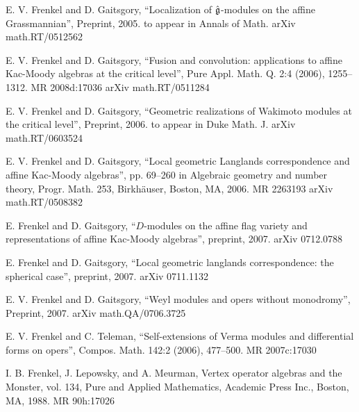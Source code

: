 \par{} E. V. Frenkel and D. Gaitsgory, ``Localization of $\hat{\mathfrak{g}}$-modules on the affine Grassmannian'', Preprint, 2005. to appear in Annals of Math. arXiv math.RT/0512562

\par{} E. V. Frenkel and D. Gaitsgory, ``Fusion and convolution: applications to affine Kac-Moody algebras at the critical level'', Pure Appl. Math. Q. 2:4 (2006), 1255--1312. MR 2008d:17036 arXiv math.RT/0511284

\par{} E. V. Frenkel and D. Gaitsgory, ``Geometric realizations of Wakimoto modules at the critical level'', Preprint, 2006. to appear in Duke Math. J. arXiv math.RT/0603524

\par{} E. V. Frenkel and D. Gaitsgory, ``Local geometric Langlands correspondence and affine Kac-Moody algebras'', pp. 69--260 in Algebraic geometry and number theory, Progr. Math. 253, Birkh\"auser, Boston, MA, 2006. MR 2263193 arXiv math.RT/0508382

\par{} E. Frenkel and D. Gaitsgory, ``$D$-modules on the affine flag variety and representations of affine Kac-Moody algebras'', preprint, 2007. arXiv 0712.0788

\par{} E. Frenkel and D. Gaitsgory, ``Local geometric langlands correspondence: the spherical case'', preprint, 2007. arXiv 0711.1132

\par{} E. V. Frenkel and D. Gaitsgory, ``Weyl modules and opers without monodromy'', Preprint, 2007. arXiv math.QA/0706.3725

\par{} E. V. Frenkel and C. Teleman, ``Self-extensions of Verma modules and differential forms on opers'', Compos. Math. 142:2 (2006), 477--500. MR 2007c:17030

\par\noindent [Frenkel et al. 1988] I. B. Frenkel, J. Lepowsky, and A. Meurman, Vertex operator algebras and the Monster, vol. 134, Pure and Applied Mathematics, Academic Press Inc., Boston, MA, 1988. MR 90h:17026

